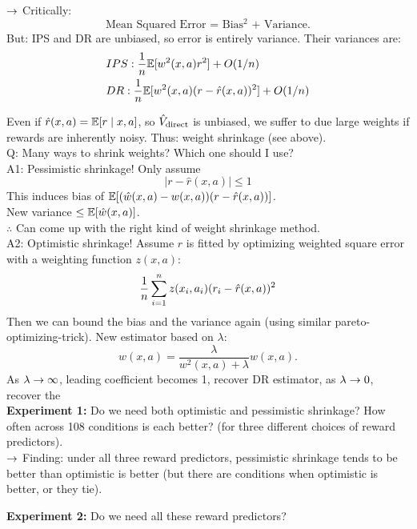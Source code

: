 $\rightarrow$ Critically:
\[
\text{Mean Squared Error = Bias$^2$ + Variance.}
\]
But: IPS and DR are unbiased, so error is entirely variance. Their variances are:
\begin{align}
    &IPS: \frac{1}{n}\mathbb{E}[w^2(x,a)r^2] + O(1/n) \\
    &DR: \frac{1}{n}\mathbb{E}[w^2(x,a)(r - \hat{r}(x,a))^2] + O(1/n) \\
\end{align}

Even if $\hat{r}(x,a) = \mathbb{E}[r \mid x,a]$, so $\hat{V}_{\text{direct}}$ is unbiased, we suffer to due large weights if rewards are inherently noisy. Thus: weight shrinkage (see above). \\

Q: Many ways to shrink weights? Which one should I use? \\

A1: Pessimistic shrinkage! Only assume
\[
|r - \hat{r}(x,a)| \leq 1
\]
This induces bias of $\mathbb{E}[(\hat{w}(x,a) - w(x,a))(r-\hat{r}(x,a))]$. \\

New variance $\leq \mathbb{E}[\hat{w}(x,a)]$. \\

$\therefore$ Can come up with the right kind of weight shrinkage method. \\

A2: Optimistic shrinkage! Assume $\hat{r}$ is fitted by optimizing weighted square error with a weighting function $z(x,a)$:
\[
\frac{1}{n} \sum_{i = 1}^n z(x_i, a_i) (r_i - \hat{r}(x,a))^2
\]
Then we can bound the bias and the variance again (using similar pareto-optimizing-trick). New estimator based on $\lambda$:
\[
\hat{w}(x,a) = \frac{\lambda}{w^2(x,a) + \lambda} w(x,a).
\]
As $\lambda \rightarrow \infty$, leading coefficient becomes 1, recover DR estimator, as $\lambda \rightarrow 0$, recover the  \\

{\bf Experiment 1:} Do we need both optimistic and pessimistic shrinkage? How often across 108 conditions is each better? (for three different choices of reward predictors). \\

$\rightarrow$ Finding: under all three reward predictors, pessimistic shrinkage tends to be better than optimistic is better (but there are conditions when optimistic is better, or they tie).

{\bf Experiment 2:} Do we need all these reward predictors? \\

